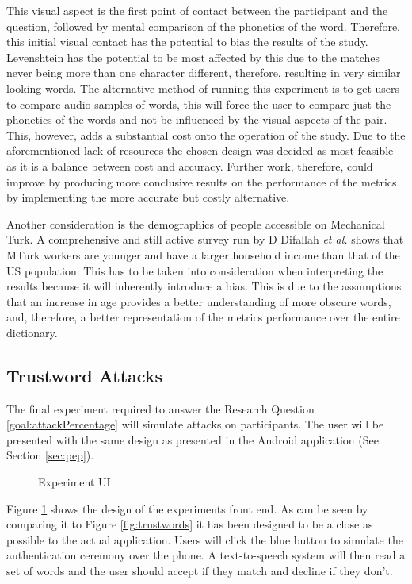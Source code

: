 This visual aspect is the first point of contact between the participant and the question, followed by mental comparison of the phonetics of the word. Therefore, this initial visual contact has the potential to bias the results of the study. Levenshtein has the potential to be most affected by this due to the matches never being more than one character different, therefore, resulting in very similar looking words. The alternative method of running this experiment is to get users to compare audio samples of words, this will force the user to compare just the phonetics of the words and not be influenced by the visual aspects of the pair. This, however, adds a substantial cost onto the operation of the study. Due to the aforementioned lack of resources the chosen design was decided as most feasible as it is a balance between cost and accuracy. Further work, therefore, could improve by producing more conclusive results on the performance of the metrics by implementing the more accurate but costly alternative.

Another consideration is the demographics of people accessible on Mechanical Turk. A comprehensive and still active survey run by D Difallah \textit{et al.} \cite{difallah2018demographics} shows that MTurk workers are younger and have a larger household income than that of the US population. This has to be taken into consideration when interpreting the results because it will inherently introduce a bias. This is due to the assumptions that an increase in age provides a better understanding of more obscure words, and, therefore, a better representation of the metrics performance over the entire dictionary.

\subsection{Trustword Attacks}
\label{sec:exp2_design}

The final experiment required to answer the Research Question \ref{goal:attackPercentage} will simulate attacks on participants. The user will be presented with the same design as presented in the \pep Android application (See Section \ref{sec:pep}).

\begin{figure}[h!]
    \centering
    \caption{Experiment UI}
    \label{fig:expID}
\end{figure}

Figure \ref{fig:expID} shows the design of the experiments front end. As can be seen by comparing it to Figure \ref{fig:trustwords} it has been designed to be a close as possible to the actual application. Users will click the blue button to simulate the authentication ceremony over the phone. A text-to-speech system will then read a set of words and the user should accept if they match and decline if they don't.

